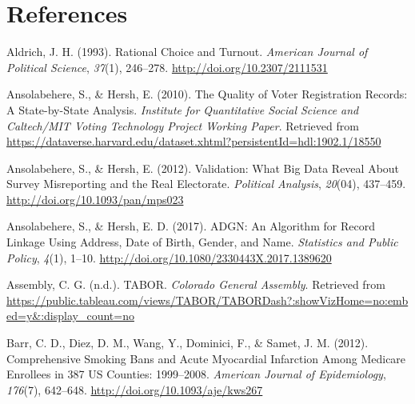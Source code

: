 \documentclass[12pt,twoside]{reedthesis}
\begin{document}
  \setcounter{chapter}{4} \setcounter{section}{0}
  
  \appendix
  
  \backmatter
  
  \chapter{References}\label{references}
  
  \noindent
  
  \setlength{\parindent}{-0.20in} \setlength{\leftskip}{0.20in}
  \setlength{\parskip}{8pt}
  
  \hypertarget{refs}{}
  \hypertarget{ref-aldrich_rational_1993}{}
  Aldrich, J. H. (1993). Rational Choice and Turnout. \emph{American
  Journal of Political Science}, \emph{37}(1), 246--278.
  \url{http://doi.org/10.2307/2111531}
  
  \hypertarget{ref-ansolabehere_quality_2010}{}
  Ansolabehere, S., \& Hersh, E. (2010). The Quality of Voter Registration
  Records: A State-by-State Analysis. \emph{Institute for Quantitative
  Social Science and Caltech/MIT Voting Technology Project Working Paper}.
  Retrieved from
  \url{https://dataverse.harvard.edu/dataset.xhtml?persistentId=hdl:1902.1/18550}
  
  \hypertarget{ref-ansolabehere_validation:_2012}{}
  Ansolabehere, S., \& Hersh, E. (2012). Validation: What Big Data Reveal
  About Survey Misreporting and the Real Electorate. \emph{Political
  Analysis}, \emph{20}(04), 437--459.
  \url{http://doi.org/10.1093/pan/mps023}
  
  \hypertarget{ref-ansolabehere_adgn:_2017}{}
  Ansolabehere, S., \& Hersh, E. D. (2017). ADGN: An Algorithm for Record
  Linkage Using Address, Date of Birth, Gender, and Name. \emph{Statistics
  and Public Policy}, \emph{4}(1), 1--10.
  \url{http://doi.org/10.1080/2330443X.2017.1389620}
  
  \hypertarget{ref-colorado_general_assembly_tabor_nodate}{}
  Assembly, C. G. (n.d.). TABOR. \emph{Colorado General Assembly}.
  Retrieved from
  \url{https://public.tableau.com/views/TABOR/TABORDash?:showVizHome=no:embed=y\&:display_count=no}
  
  \hypertarget{ref-barr_comprehensive_2012}{}
  Barr, C. D., Diez, D. M., Wang, Y., Dominici, F., \& Samet, J. M.
  (2012). Comprehensive Smoking Bans and Acute Myocardial Infarction Among
  Medicare Enrollees in 387 US Counties: 1999--2008. \emph{American
  Journal of Epidemiology}, \emph{176}(7), 642--648.
  \url{http://doi.org/10.1093/aje/kws267}
  
\end{document}
